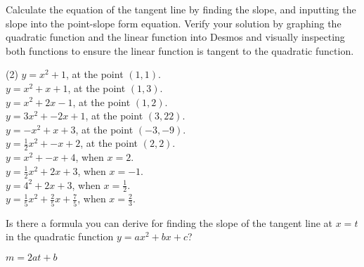 \documentclass[12pt,fleqn]{book}
\newcommand{\prb}[1]{\begin{Exercise}#1\end{Exercise}}
\newcommand{\sol}[1]{\begin{Answer}#1\end{Answer}}
\begin{document}
\prb{Calculate the equation of the tangent line by finding the slope, and inputting the slope into the point-slope form equation.  Verify your solution by graphing the quadratic function and the linear function into Desmos and visually inspecting both functions to ensure the linear function is tangent to the quadratic function.
	\begin{tasks}(2)
		\task $y=x^2 + 1$, at the point $( 1, 1 )$.
		\\[10em]
		\task $y=x^2 + x + 1$, at the point $( 1, 3 )$.
		\\[10em]
		\task $y=x^2 + 2x -1$, at the point $( 1,  2)$.
		\\[10em]
		\task $y=3x^2 + -2x + 1$, at the point $( 3, 22 )$.
		\\[10em]
		\task $y=-x^2 + x + 3$, at the point $( -3, -9 )$.
		\\[10em]
		\task $y=\frac 12 x^2 + -x + 2$, at the point $( 2,  2)$.
		\\[10em]
		\task $y=x^2 + -x + 4$, when $x=2$.
		\\[10em]
		\task $y=\frac 12x^2 + 2x + 3$, when $x=-1$.
		\\[10em]
		\task $y=4^2 + 2x + 3$, when $x=\frac 12$.
		\\[10em]
		\task $y=\frac 15 x^2 + \frac 25x + \frac 75$, when $x=\frac 23$.
		\\[10em]
	\end{tasks}
}
\prb{Is there a formula you can derive for finding the slope of the tangent line at $x=t$ in the quadratic function $y=ax^2+bx+c$?}
\sol{$m=2at+b$}
\end{document}
